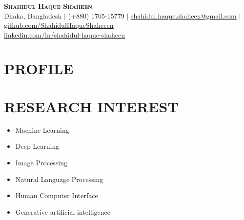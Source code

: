 \documentclass[letterpaper,11pt]{article}
\begin{document}
\begin{center}
    \textbf{\Huge \scshape Shahidul Haque Shaheen} \\ \vspace{1pt}
    \small Dhaka, Bangladesh $|$ (+880) 1705-15779  $|$ \href{mailto:shahidul.haque.shaheen@gmail.com}{\underline{shahidul.haque.shaheen@gmail.com}} $|$
    \href{https://github.com/ShahidulHaqueShaheeen}{\underline{github.com/ShahidulHaqueShaheeen}} \\ \vspace{1pt}
    \href{https://www.linkedin.com/in/shahidul-haque-shaheen/}{\underline{linkedin.com/in/shahidul-haque-shaheen}}
\end{center}



\section{\textbf{PROFILE}}


\section*{\textbf{RESEARCH INTEREST}}
\begin{minipage}[t]{0.33\textwidth}
  \begin{itemize}[left=0cm]
    \setlength\itemsep{-0.075em} %
    \setlength\parskip{-0.075em} %
    \item Machine Learning
    \item Deep Learning
  \end{itemize}
\end{minipage}%
\begin{minipage}[t]{0.33\textwidth}
  \begin{itemize}[left=0cm]
    \setlength\itemsep{-0.075em} %
    \setlength\parskip{-0.075em} %
    \item Image Processing
    \item Natural Language Processing
  \end{itemize}
\end{minipage}%
\begin{minipage}[t]{0.33\textwidth}
  \begin{itemize}[left=0cm]
    \setlength\itemsep{-0.075em} %
    \setlength\parskip{-0.075em}
    \item Human Computer Interface
    \item Generative artificial intelligence
  \end{itemize}
\end{minipage}
\end{document}
